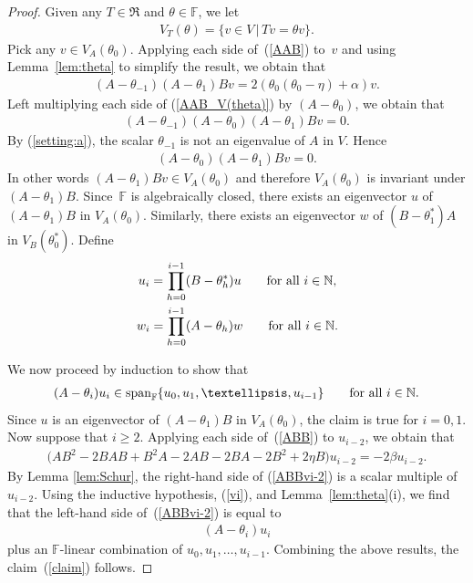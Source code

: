 \documentclass[11pt]{article}
\numberwithin{equation}{section}
\def\N{\mathbb N}
\def\F{\mathbb F}
\numberwithin{equation}{section}
\begin{document}
\begin{proof}
Given any $T\in \Re$ and $\theta\in \F$, we let
\begin{gather*}
V_T(\theta)=\{v\in V\,|\, Tv=\theta v\}.
\end{gather*}
Pick any $v\in V_A(\theta_0)$. Applying each side of~(\ref{AAB}) to~$v$ and using Lemma~\ref{lem:theta} to simplify the result, we obtain that
\begin{gather}\label{AAB_V(theta)}
(A-\theta_{-1})(A-\theta_1) B v=2(\theta_0(\theta_0-\eta)+\alpha)v.
\end{gather}
Left multiplying each side of (\ref{AAB_V(theta)}) by $(A-\theta_0)$, we obtain that
\begin{gather*}
(A-\theta_{-1})(A-\theta_0)(A-\theta_1) B v=0.
\end{gather*}
By (\ref{setting:a}), the scalar $\theta_{-1}$ is not an eigenvalue of $A$ in $V$. Hence
\begin{gather*}
(A-\theta_0)(A-\theta_1) B v=0.
\end{gather*}
In other words $(A-\theta_1) B v\in V_A(\theta_0)$ and therefore $V_A(\theta_0)$ is invariant under $(A-\theta_1) B$. Since~$\F$ is algebraically closed, there exists an eigenvector $u$ of $(A-\theta_1) B$ in $V_A(\theta_0)$. Similarly, there exists an eigenvector $w$ of $(B-\theta_1^*)A$ in $V_B(\theta_0^*)$. Define
\begin{gather}
u_i=\prod_{h=0}^{i-1} (B-\theta_h^*) u \qquad \hbox{for all $i\in \N$},\label{vi}\\
w_i=\prod_{h=0}^{i-1} (A-\theta_h) w\qquad \hbox{for all $i\in \N$}. \label{wi}
\end{gather}

We now proceed by induction to show that
\begin{gather}\label{claim}
(A-\theta_i)u_i\in \operatorname{span}_\F\{u_0,u_1,\ldots,u_{i-1}\} \qquad \hbox{for all $i\in \N$}.
\end{gather}
Since $u$ is an eigenvector of $(A-\theta_1) B$ in $V_A(\theta_0)$, the claim is true for $i=0,1$.
Now suppose that $i\geq 2$. Applying each side of~(\ref{ABB}) to $u_{i-2}$, we obtain that
\begin{gather}\label{ABBvi-2}
\big(A B^2 -2 BAB +B^2 A - 2 A B-2 BA-2 B^2+2 \eta B\big) u_{i-2}=-2 \beta u_{i-2}.
\end{gather}
By Lemma \ref{lem:Schur}, the right-hand side of (\ref{ABBvi-2}) is a scalar multiple of~$u_{i-2}$. Using the inductive hypothesis, (\ref{vi}), and Lemma~\ref{lem:theta}(i), we find that the left-hand side of~(\ref{ABBvi-2}) is equal to
\begin{gather}\label{ABBvi-2:LH'}
(A-\theta_i) u_i
\end{gather}
plus an $\F$-linear combination of $u_0,u_1,\ldots,u_{i-1}$. Combining the above results, the claim~(\ref{claim}) follows.


\end{proof}
\end{document}
